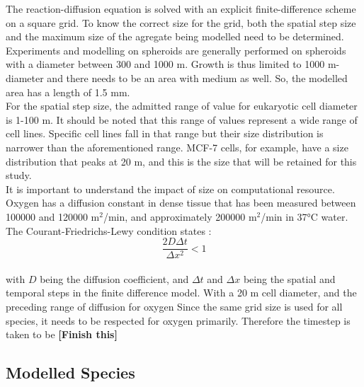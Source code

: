 \documentclass[11pt,a4paper]{article}
\begin{document}
The reaction-diffusion equation is solved with an explicit finite-difference scheme on a square grid. To know the correct size for the grid, both the spatial step size and the maximum size of the agregate being modelled need to be determined. Experiments and modelling on spheroids are generally performed on spheroids with a diameter between 300 and 1000 \textmu m.\cite{Mao2018}\cite{Freyer1986}\cite{MullerKlieser1986} Growth is thus limited to 1000 \textmu m-diameter and there needs to be an area with medium as well. So, the modelled area has a length of 1.5 mm.\\

For the spatial step size, the admitted range of value for eukaryotic cell diameter is 1-100 \textmu m.\cite{Cooper2006} It should be noted that this  range of values represent a wide range of cell lines. Specific cell lines fall in  that range but their size distribution is narrower than the aforementioned range. MCF-7 cells, for example,  have a size distribution that peaks at 20 \textmu m,\cite{Moon2013} and this is the size that will be retained for this study.\\

It is important to understand the impact of size on computational resource. Oxygen has a diffusion constant in dense tissue that has been measured between 100000 and 120000 \textmu m$^2$/min,\cite{Mao2018}\cite{Casciari1992} and approximately 200000 \textmu m$^{2}$/min in 37°C water.\cite{Wise1966}\cite{Macdougall1967} The Courant-Friedrichs-Lewy condition states :\\

\[ \frac{2 D \Delta t}{\Delta x^2} < 1 \] \\

with $D$ being the diffusion coefficient, and $\Delta t$ and $\Delta x$ being the spatial and temporal steps in the finite difference model. With a 20 \textmu m cell diameter, and the preceding range of diffusion for oxygen Since the same grid size is used for all species, it needs to be respected for oxygen primarily. Therefore the timestep is taken to be \textbf{[Finish this]}\\
\subsection{Modelled Species}


\end{document}
